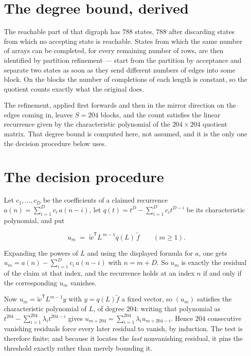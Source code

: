 \documentclass[11pt]{article}
\theoremstyle{definition}
\begin{document}
\section{The degree bound, derived}

The reachable part of that digraph has $788$ states, $788$ after discarding states from which no accepting state is reachable. States from which the same number of arrays can be completed, for every remaining number of rows, are then identified by partition refinement --- start from the partition by acceptance and separate two states as soon as they send different numbers of edges into some block. On the blocks the number of completions of each length is constant, so the quotient counts exactly what the original does.

The refinement, applied first forwards and then in the mirror direction on the edges coming in, leaves $S = 204$ blocks, and the count satisfies the linear recurrence given by the characteristic polynomial of the $204 \times 204$ quotient matrix. That degree bound is computed here, not assumed, and it is the only one the decision procedure below uses.

\section{The decision procedure}

Let $c_1,\dots,c_D$ be the coefficients of a claimed recurrence $a(n) = \sum_{i=1}^{D} c_i\,a(n-i)$, let $q(t) = t^{D} - \sum_{i=1}^{D} c_i t^{D-i}$ be its characteristic polynomial, and put

\[u_m \;=\; \tilde w^{\mathsf T} L^{\,m-1} q(L)\,\tilde f \qquad (m \ge 1).\]

Expanding the powers of $L$ and using the displayed formula for $a$, one gets $u_m = a(n) - \sum_{i=1}^{D} c_i\,a(n-i)$ with $n = m + D$. So $u_m$ is exactly the residual of the claim at that index, and the recurrence holds at an index $n$ if and only if the corresponding $u_m$ vanishes.

Now $u_m = \tilde w^{\mathsf T} L^{m-1} y$ with $y = q(L)\tilde f$ a fixed vector, so $(u_m)$ satisfies the characteristic polynomial of $L$, of degree $204$: writing that polynomial as $t^{204} - \sum_{i=1}^{204} \lambda_i t^{204-i}$ gives $u_{m+204} = \sum_{i=1}^{204} \lambda_i u_{m+204-i}$. Hence $204$ consecutive vanishing residuals force every later residual to vanish, by induction. The test is therefore finite; and because it locates the {\itshape last} nonvanishing residual, it pins the threshold exactly rather than merely bounding it.
\end{document}
